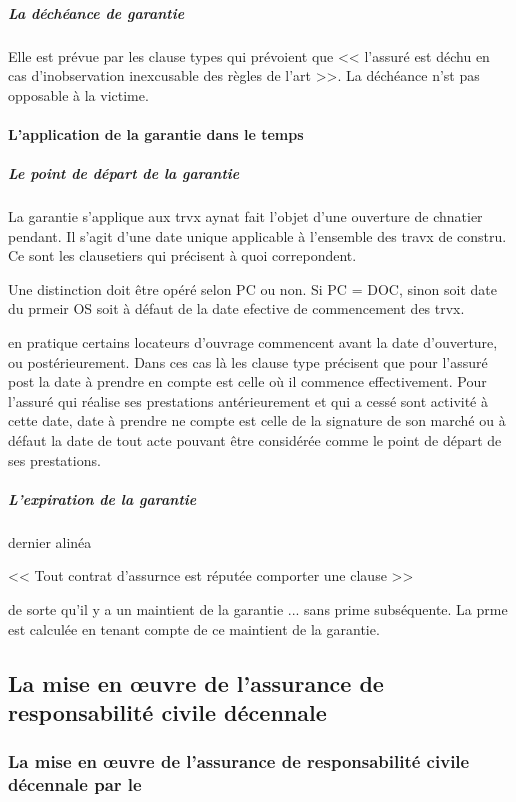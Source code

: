 				\subparagraph{La déchéance de garantie}\label{rcDecheance} Elle est prévue par les clause types qui prévoient que << l'assuré est déchu en cas d'inobservation inexcusable des règles de l'art >>. La déchéance n'st pas opposable à la victime.

			\paragraph{L'application de la garantie dans le temps}



				\subparagraph{Le point de départ de la garantie}

					La garantie s'applique aux trvx aynat fait l'objet d'une ouverture de chnatier pendant.
					Il s'agit d'une date unique applicable à l'ensemble des travx de constru.
					Ce sont les clausetiers qui précisent à quoi correpondent.

					Une distinction doit être opéré selon PC ou non. Si PC = DOC, sinon soit date du prmeir OS soit à défaut de la date efective de commencement des trvx.

					en pratique certains locateurs d'ouvrage commencent avant la date d'ouverture, ou postérieurement. Dans ces cas là les clause type précisent que pour l'assuré post la date à prendre en compte est celle où il commence effectivement. Pour l'assuré qui réalise ses prestations antérieurement et qui a cessé sont activité à cette date, date à prendre ne compte est celle de la signature de son marché ou à défaut la date de tout acte pouvant être considérée comme le point de départ de ses prestations.

				\subparagraph{L'expiration de la garantie}

					dernier alinéa

					<< Tout contrat d'assurnce est réputée comporter une clause >>

					de sorte qu'il y a un maintient de la garantie ... sans prime subséquente. La prme est calculée en tenant compte de ce maintient de la garantie.

	\subsection{La mise en œuvre de l'assurance de responsabilité civile décennale}


		\subsubsection{La mise en œuvre de l'assurance de responsabilité civile décennale par le \Mo}

